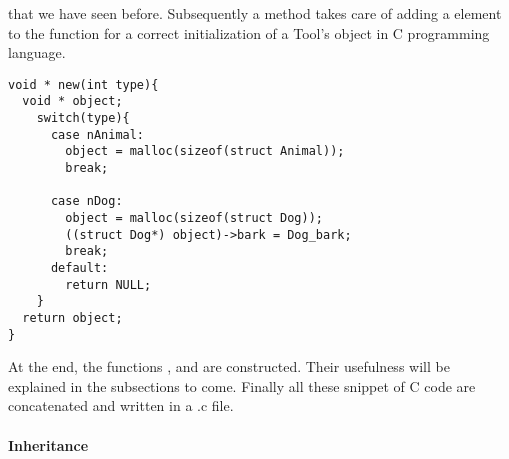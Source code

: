 that we have seen before. %
Subsequently a method \lstset{style=customc}{\lstinline[basicstyle=\small\ttfamily]|addStructConstructor|}
takes care of adding a \lstset{style=customc}{\lstinline[basicstyle=\small\ttfamily]|case|} element
to the \lstset{style=customc}{\lstinline[basicstyle=\small\ttfamily]|new|} function for a correct
initialization of a Tool's object in C programming language.
\begin{lstlisting}[caption={In the case of the example used in the section 2. Examples}, captionpos=b]
void * new(int type){
  void * object;
    switch(type){
      case nAnimal:
        object = malloc(sizeof(struct Animal));
        break;

      case nDog:
        object = malloc(sizeof(struct Dog));
        ((struct Dog*) object)->bark = Dog_bark;
        break;
      default:
        return NULL;
    }
  return object;
}
\end{lstlisting}
\newline
At the end, the functions
\newline
\lstset{style=customc}{\lstinline[basicstyle=\small\ttfamily]|void helper_reverse_plus(char str[], int len)|},
\lstset{style=customc}{\lstinline[basicstyle=\small\ttfamily]|char* itoa(int num)|} and
\lstset{style=customc}{\lstinline[basicstyle=\small\ttfamily]|int * arrayAlloc(int size)|} are constructed.
Their usefulness will be explained in the subsections to come.
\newline
Finally all these snippet of C code are concatenated and written in a .c file.
\newline
\paragraph{Inheritance}

